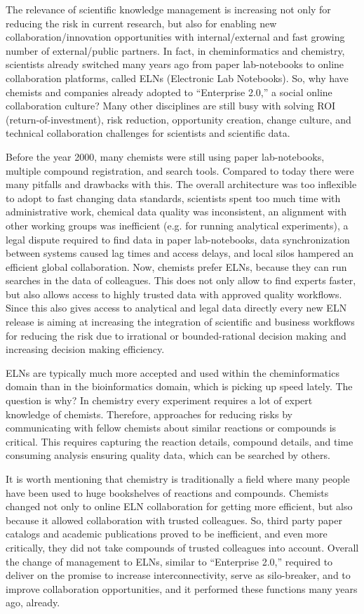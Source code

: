 \documentclass{sig-alternate}
\begin{document}
The relevance of scientific knowledge management is increasing not only for
reducing the risk in current research, but also for enabling new
collaboration/innovation opportunities with internal/external and fast growing
number of external/public partners. In fact, in cheminformatics and chemistry,
scientists already switched many years ago from paper lab-notebooks to
online collaboration platforms, called ELNs (Electronic Lab Notebooks). So, why
have chemists and companies already adopted to ``Enterprise 2.0,'' a social
online collaboration culture? Many other disciplines are still busy with solving
ROI (return-of-investment), risk reduction, opportunity creation, change
culture, and technical collaboration challenges for scientists and scientific
data.

Before the year 2000, many chemists were still using paper
lab-notebooks, multiple compound registration, and search tools. Compared to
today there were many pitfalls and drawbacks with this. The overall architecture
was too inflexible to adopt to fast changing data standards, scientists spent
too much time with administrative work, chemical data quality was inconsistent,
an alignment with other working groups was inefficient (e.g. for running
analytical experiments), a legal dispute required to find data in paper
lab-notebooks, data synchronization between systems caused lag times and access
delays, and local silos hampered an efficient global collaboration. Now,
chemists prefer ELNs, because they can run searches in the data of colleagues. This does
not only allow to find experts faster, but also allows access to highly trusted
data with approved quality workflows. Since this also gives access to
analytical and legal data directly every new ELN release is aiming at increasing
the integration of scientific and business workflows for reducing the risk due
to irrational or bounded-rational decision making and increasing decision making
efficiency.

ELNs are typically much more accepted and used within the cheminformatics
domain than in the bioinformatics domain, which is picking up speed lately. The
question is why? In chemistry every experiment requires a lot of expert
knowledge of chemists. Therefore, approaches for reducing risks by communicating
with fellow chemists about similar reactions or compounds is critical. This
requires capturing the reaction details, compound details, and time consuming
analysis ensuring quality data, which can be searched by others.

It is worth mentioning that chemistry is traditionally a field where many people
have been used to huge bookshelves of reactions and compounds. Chemists changed
not only to online ELN collaboration for getting more efficient, but also
because it allowed collaboration with trusted colleagues. So, third party paper
catalogs and academic publications proved to be
inefficient, and even more critically, they did not take compounds of trusted
colleagues into account. Overall the change of management to ELNs, similar to
``Enterprise 2.0,'' required to deliver on the promise to increase
interconnectivity, serve as silo-breaker, and to improve collaboration
opportunities, and it performed these functions many years ago, already.
\end{document}
